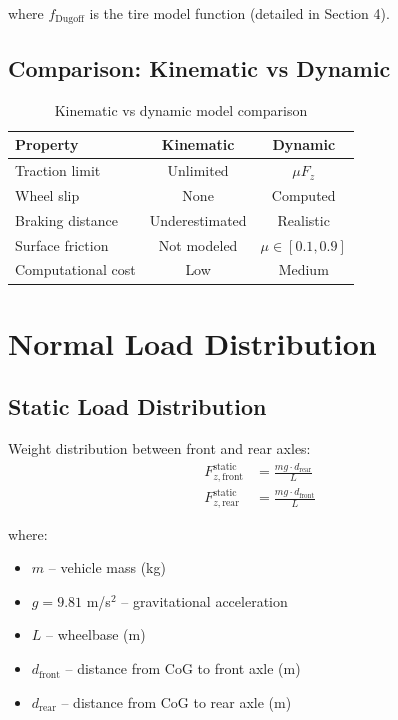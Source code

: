 \documentclass[11pt,a4paper]{article}
\begin{document}
where $f_{\text{Dugoff}}$ is the tire model function (detailed in Section 4).

\subsection{Comparison: Kinematic vs Dynamic}

\begin{table}[h]
\centering
\begin{tabular}{lcc}
\toprule
\textbf{Property} & \textbf{Kinematic} & \textbf{Dynamic} \\
\midrule
Traction limit & Unlimited & $\mu F_z$ \\
Wheel slip & None & Computed \\
Braking distance & Underestimated & Realistic \\
Surface friction & Not modeled & $\mu \in [0.1, 0.9]$ \\
Computational cost & Low & Medium \\
\bottomrule
\end{tabular}
\caption{Kinematic vs dynamic model comparison}
\end{table}

\section{Normal Load Distribution}

\subsection{Static Load Distribution}

Weight distribution between front and rear axles:
\begin{align}
F_{z,\text{front}}^{\text{static}} &= \frac{mg \cdot d_{\text{rear}}}{L} \\
F_{z,\text{rear}}^{\text{static}} &= \frac{mg \cdot d_{\text{front}}}{L}
\end{align}

where:
\begin{itemize}
    \item $m$ -- vehicle mass (kg)
    \item $g = 9.81$ m/s$^2$ -- gravitational acceleration
    \item $L$ -- wheelbase (m)
    \item $d_{\text{front}}$ -- distance from CoG to front axle (m)
    \item $d_{\text{rear}}$ -- distance from CoG to rear axle (m)
\end{itemize}
\end{document}

